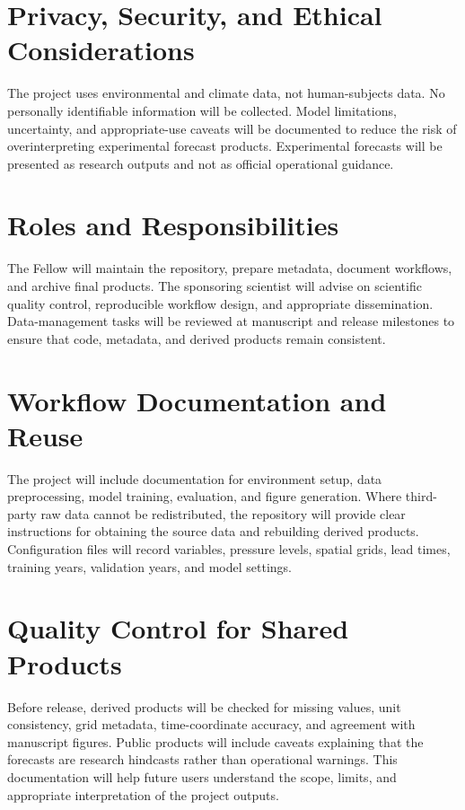 \documentclass[11pt,letterpaper]{article}
\begin{document}
\section*{Privacy, Security, and Ethical Considerations}
The project uses environmental and climate data, not human-subjects data. No personally identifiable information will be collected. Model limitations, uncertainty, and appropriate-use caveats will be documented to reduce the risk of overinterpreting experimental forecast products. Experimental forecasts will be presented as research outputs and not as official operational guidance.

\section*{Roles and Responsibilities}
The Fellow will maintain the repository, prepare metadata, document workflows, and archive final products. The sponsoring scientist will advise on scientific quality control, reproducible workflow design, and appropriate dissemination. Data-management tasks will be reviewed at manuscript and release milestones to ensure that code, metadata, and derived products remain consistent.

\newpage
\section*{Workflow Documentation and Reuse}
The project will include documentation for environment setup, data preprocessing, model training, evaluation, and figure generation. Where third-party raw data cannot be redistributed, the repository will provide clear instructions for obtaining the source data and rebuilding derived products. Configuration files will record variables, pressure levels, spatial grids, lead times, training years, validation years, and model settings.

\section*{Quality Control for Shared Products}
Before release, derived products will be checked for missing values, unit consistency, grid metadata, time-coordinate accuracy, and agreement with manuscript figures. Public products will include caveats explaining that the forecasts are research hindcasts rather than operational warnings. This documentation will help future users understand the scope, limits, and appropriate interpretation of the project outputs.
\end{document}

